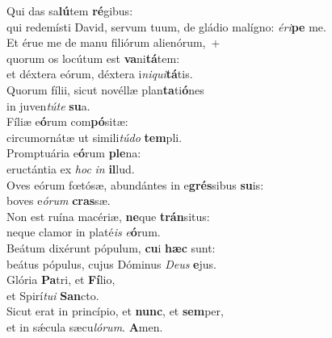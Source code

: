 \evenverse Qui das sa\textbf{lú}tem \textbf{ré}gibus:~\*\\
\evenverse qui redemísti David, servum tuum, de gládio malígno: \textit{é}\textit{ri}\textbf{pe} me.\\
\oddverse Et érue me de manu filiórum alienórum,~+\\
\oddverse  quorum os locútum est \textbf{va}ni\textbf{tá}tem:~\*\\
\oddverse et déxtera eórum, déxtera i\textit{ni}\textit{qui}\textbf{tá}tis.\\
\evenverse Quorum fílii, sicut novéllæ plan\textbf{ta}ti\textbf{ó}nes~\*\\
\evenverse in juven\textit{tú}\textit{te} \textbf{su}a.\\
\oddverse Fíliæ e\textbf{ó}rum com\textbf{pó}sitæ:~\*\\
\oddverse circumornátæ ut simili\textit{tú}\textit{do} \textbf{tem}pli.\\
\evenverse Promptuária e\textbf{ó}rum \textbf{ple}na:~\*\\
\evenverse eructántia ex \textit{hoc} \textit{in} \textbf{il}lud.\\
\oddverse Oves eórum fœtósæ, abundántes in e\textbf{grés}sibus \textbf{su}is:~\*\\
\oddverse boves e\textit{ó}\textit{rum} \textbf{cras}sæ.\\
\evenverse Non est ruína macériæ, \textbf{ne}que \textbf{trán}situs:~\*\\
\evenverse neque clamor in platé\textit{is} \textit{e}\textbf{ó}rum.\\
\oddverse Beátum dixérunt pópulum, \textbf{cu}i \textbf{hæc} sunt:~\*\\
\oddverse beátus pópulus, cujus Dóminus \textit{De}\textit{us} \textbf{e}jus.\\
\evenverse Glória \textbf{Pa}tri, et \textbf{Fí}lio,~\*\\
\evenverse et Spirí\textit{tu}\textit{i} \textbf{San}cto.\\
\oddverse Sicut erat in princípio, et \textbf{nunc}, et \textbf{sem}per,~\*\\
\oddverse et in sǽcula sæcu\textit{ló}\textit{rum}. \textbf{A}men.\\
